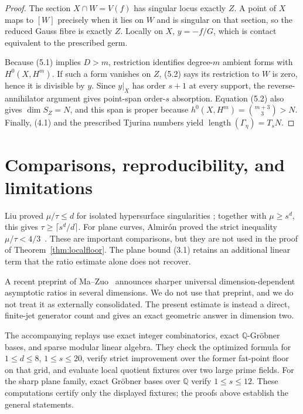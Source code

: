 \documentclass[11pt,a4paper]{article}
\theoremstyle{definition}
\numberwithin{equation}{section}
\newcommand{\length}{\operatorname{length}}
\begin{document}
\begin{proof}
The section \(X\cap W=V(f)\) has singular locus exactly \(Z\).  A point of
\(X\) maps to \([W]\) precisely when it lies on \(W\) and is singular on
that section, so the reduced Gauss fibre is exactly \(Z\).  Locally on \(X\),
\(y=-f/G\), which is contact equivalent to the prescribed germ.

Because (5.1) implies \(D>m\), restriction identifies degree-\(m\) ambient
forms with \(H^0(X,H^m)\).  If such a form vanishes on \(Z\), (5.2) says its
restriction to \(W\) is zero, hence it is divisible by \(y\).  Since
\(y|_X\) has order \(s+1\) at every support, the reverse-annihilator argument
gives point-span order-\(s\) absorption.  Equation (5.2) also gives
\(\dim S_Z=N\), and this span is proper because
\(h^0(X,H^m)=\binom{m+3}{3}>N\).  Finally, (4.1) and the prescribed
Tjurina numbers yield \(\length(\Gamma_\eta)=T_sN\).
\end{proof}

\medskip
\section{Comparisons, reproducibility, and limitations}

Liu proved \(\mu/\tau\le d\) for isolated hypersurface singularities
\cite{Liu2018}; together with \(\mu\ge s^d\), this gives
\(\tau\ge\lceil s^d/d\rceil\).  For plane curves, Almir\'on proved the
strict inequality \(\mu/\tau<4/3\)~\cite{Almiron2022}.  These are important
comparisons, but they are not used in the proof of
Theorem~\ref{thm:localfloor}.  The plane bound (3.1) retains an additional
linear term that the ratio estimate alone does not recover.

A recent preprint of Ma--Zuo~\cite{MaZuo2026} announces sharper universal
dimension-dependent asymptotic ratios in several dimensions.  We do not
use that preprint, and we do not treat it as externally consolidated.  The
present estimate is instead a direct, finite-jet generator count and gives
an exact geometric answer in dimension two.

The accompanying replays use exact integer combinatorics, exact
\(\mathbb Q\)-Gröbner bases, and sparse modular linear algebra.  They check
the optimized formula for
\(1\le d\le8\), \(1\le s\le20\), verify strict improvement over the former
fat-point floor on that grid, and evaluate local quotient fixtures over two
large prime fields.  For the sharp plane family, exact Gröbner bases over
\(\mathbb Q\) verify \(1\le s\le12\).  These computations certify only the
displayed fixtures; the proofs above establish the general statements.
\end{document}
